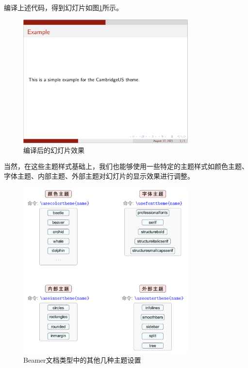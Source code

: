 编译上述代码，得到幻灯片如图\ref{figeg:002}所示。

\begin{figure}[htbp]
    \centering
    \includegraphics[width = 0.8\textwidth]{images/ch_9/example_sec2_1.png}
    \caption{编译后的幻灯片效果}
    \label{figeg:002}
\end{figure}

当然，在这些主题样式基础上，我们也能够使用一些特定的主题样式如颜色主题、字体主题、内部主题、外部主题对幻灯片的显示效果进行调整。

\begin{figure}[htbp]
    \centering
    \includegraphics[width = 0.8\textwidth]{images/ch_9/other_themes.pdf}
    \caption{Beamer文档类型中的其他几种主题设置}
    \label{figeg:003}
\end{figure}

